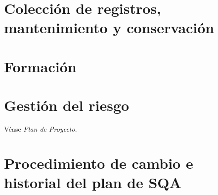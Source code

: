 \documentclass[11pt, a4paper, twoside, titlepage]{article}
\begin{document}
	\section{Colección de registros, mantenimiento y conservación}%
	\section{Formación}%
	\section{Gestión del riesgo}
		Véase \textit{Plan de Proyecto}.
		\printglossaries
	\section{Procedimiento de cambio e historial del plan de SQA}%


	\newpage
	
	
\end{document}
